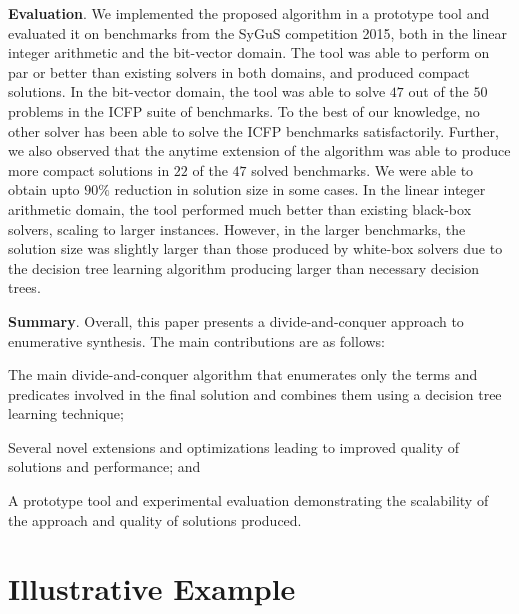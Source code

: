 \documentclass{llncs}
\newcommand{\sygus}{{\sffamily\fontsize{8.5}{10}\selectfont
    SyGuS}\xspace}
\renewcommand{\paragraph}[1]{\par\noindent\textbf{#1}.}
\begin{document}
\paragraph{Evaluation}
We implemented the proposed algorithm in a prototype tool and
evaluated it on benchmarks from the \sygus competition 2015, both in
the linear integer arithmetic and the bit-vector domain.  The tool was
able to perform on par or better than existing solvers in both
domains, and produced compact solutions.  In the bit-vector domain,
the tool was able to solve $47$ out of the $50$ problems in the ICFP
suite of benchmarks.
To the best of our knowledge, no other solver has been able to solve the
ICFP benchmarks satisfactorily.
Further, we also observed that the anytime extension
of the algorithm was able to produce more compact solutions in $22$ of
the $47$ solved benchmarks.  We were able to obtain upto $90\%$
reduction in solution size in some cases.  In the linear integer
arithmetic domain, the tool performed much better than existing
black-box solvers, scaling to larger instances.  However, in the larger
benchmarks, the solution size was slightly larger than those
produced by white-box solvers due to the decision tree learning
algorithm producing larger than necessary decision trees.

\paragraph{Summary}
Overall, this paper presents a divide-and-conquer approach to
enumerative synthesis.
The main contributions are as follows:
\begin{inparaenum}[(a)]
\item The main divide-and-conquer algorithm that enumerates only the
  terms and predicates involved in the final solution and combines them
  using a decision tree learning technique;
\item Several novel extensions and optimizations leading to improved
  quality of solutions and performance; and
\item A prototype tool and experimental evaluation demonstrating the
  scalability of the approach and quality of solutions produced.
\end{inparaenum}

\section{Illustrative Example}
\label{sec:example}
\end{document}
